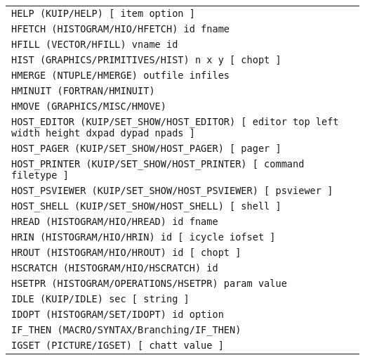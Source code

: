 \begin{longtable}{|>{\footnotesize\tt}lr|}
HELP (KUIP/HELP)  [ item option ] & \pageref{ref:KUIP/HELP}\\ 
HFETCH (HISTOGRAM/HIO/HFETCH)  id fname & \pageref{ref:HISTOGRAM/HIO/HFETCH}\\ 
HFILL (VECTOR/HFILL)  vname id & \pageref{ref:VECTOR/HFILL}\\ 
HIST (GRAPHICS/PRIMITIVES/HIST)  n x y [ chopt ] & \pageref{ref:GRAPHICS/PRIMITIVES/HIST}\\ 
HMERGE (NTUPLE/HMERGE)  outfile infiles & \pageref{ref:NTUPLE/HMERGE}\\ 
HMINUIT (FORTRAN/HMINUIT)  & \pageref{ref:FORTRAN/HMINUIT}\\ 
HMOVE (GRAPHICS/MISC/HMOVE)  & \pageref{ref:GRAPHICS/MISC/HMOVE}\\ 
HOST_EDITOR (KUIP/SET_SHOW/HOST_EDITOR)  [ editor top left width height dxpad dypad npads ] & \pageref{ref:KUIP/SET_SHOW/HOST_EDITOR}\\ 
HOST_PAGER (KUIP/SET_SHOW/HOST_PAGER)  [ pager ] & \pageref{ref:KUIP/SET_SHOW/HOST_PAGER}\\ 
HOST_PRINTER (KUIP/SET_SHOW/HOST_PRINTER)  [ command filetype ] & \pageref{ref:KUIP/SET_SHOW/HOST_PRINTER}\\ 
HOST_PSVIEWER (KUIP/SET_SHOW/HOST_PSVIEWER)  [ psviewer ] & \pageref{ref:KUIP/SET_SHOW/HOST_PSVIEWER}\\ 
HOST_SHELL (KUIP/SET_SHOW/HOST_SHELL)  [ shell ] & \pageref{ref:KUIP/SET_SHOW/HOST_SHELL}\\ 
HREAD (HISTOGRAM/HIO/HREAD)  id fname & \pageref{ref:HISTOGRAM/HIO/HREAD}\\ 
HRIN (HISTOGRAM/HIO/HRIN)  id [ icycle iofset ] & \pageref{ref:HISTOGRAM/HIO/HRIN}\\ 
HROUT (HISTOGRAM/HIO/HROUT)  id [ chopt ] & \pageref{ref:HISTOGRAM/HIO/HROUT}\\ 
HSCRATCH (HISTOGRAM/HIO/HSCRATCH)  id & \pageref{ref:HISTOGRAM/HIO/HSCRATCH}\\ 
HSETPR (HISTOGRAM/OPERATIONS/HSETPR)  param value & \pageref{ref:HISTOGRAM/OPERATIONS/HSETPR}\\ 
IDLE (KUIP/IDLE)  sec [ string ] & \pageref{ref:KUIP/IDLE}\\ 
IDOPT (HISTOGRAM/SET/IDOPT)  id option & \pageref{ref:HISTOGRAM/SET/IDOPT}\\ 
IF_THEN (MACRO/SYNTAX/Branching/IF_THEN)  & \pageref{ref:MACRO/SYNTAX/Branching/IF_THEN}\\ 
IGSET (PICTURE/IGSET)  [ chatt value ] & \pageref{ref:PICTURE/IGSET}\\ 

\end{longtable}
